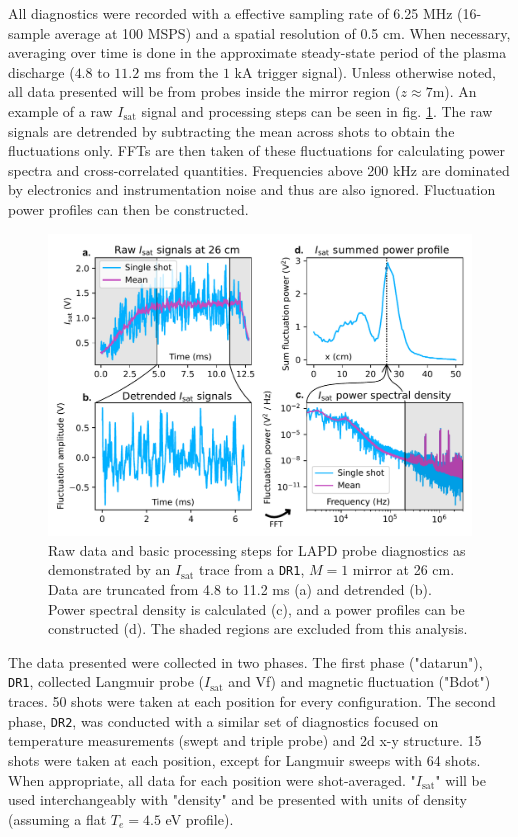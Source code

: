 All diagnostics were recorded with a effective sampling rate of 6.25 MHz (16-sample average at 100 MSPS) and a spatial resolution of 0.5 cm. When necessary, averaging over time is done in the approximate steady-state period of the plasma discharge ($4.8$ to $11.2$ ms from the $1$ kA trigger signal). Unless otherwise noted, all data presented will be from probes inside the mirror region ($z \approx 7$m). An example of a raw $I_\text{sat}$ signal and processing steps can be seen in fig. \ref{fig:raw-signals-plots}. The raw signals are detrended by subtracting the mean across shots to obtain the fluctuations only. FFTs are then taken of these fluctuations for calculating power spectra and cross-correlated quantities. Frequencies above 200 kHz are dominated by electronics and instrumentation noise and thus are also ignored. Fluctuation power profiles can then be constructed.

\begin{figure}
    \centering
    \includegraphics[width=\textwidth]{figures/fig2.pdf}
    \caption{Raw data and basic processing steps for LAPD probe diagnostics as demonstrated by an $I_\text{sat}$ trace from a \texttt{DR1}, $M=1$ mirror at 26 cm. Data are truncated from 4.8 to 11.2 ms (a) and detrended (b). Power spectral density is calculated (c), and a power profiles can be constructed (d). The shaded regions are excluded from this analysis.}
    \label{fig:raw-signals-plots}
\end{figure}

The data presented were collected in two phases. The first phase ("datarun"), \texttt{DR1}, collected Langmuir probe ($I_\text{sat}$ and Vf) and magnetic fluctuation ("Bdot") \cite{Everson_design_2009} traces. 50 shots were taken at each position for every configuration. 
The second phase, \texttt{DR2}, was conducted with a similar set of diagnostics focused on temperature measurements (swept and triple probe) and 2d x-y structure. 15 shots were taken at each position, except for Langmuir sweeps with 64 shots. When appropriate, all data for each position were shot-averaged.
"$I_\text{sat}$" will be used interchangeably with "density" and be presented with units of density (assuming a flat $T_e = 4.5$ eV profile).

